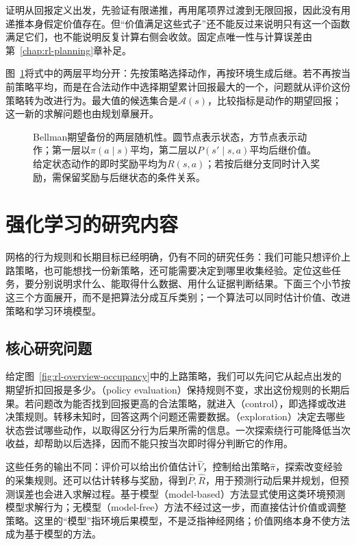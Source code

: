 证明从回报定义出发，先验证有限递推，再用尾项界过渡到无限回报，因此没有用递推本身假定价值存在。但“价值满足这些式子”还不能反过来说明只有这一个函数满足它们，也不能说明反复计算右侧会收敛。固定点唯一性与计算误差由第~\ref{chap:rl-planning}章补足。

图~\ref{fig:rl-overview-backup}将式中的两层平均分开：先按策略选择动作，再按环境生成后继。若不再按当前策略平均，而是在合法动作中选择期望累计回报最大的一个，问题就从评价这份策略转为改进行为。最大值的候选集合是$\mathcal A(s)$，比较指标是动作的期望回报；这一新的求解问题也由规划章展开。

\begin{figure}[htbp]
  \centering
  
  \caption{Bellman期望备份的两层随机性。圆节点表示状态，方节点表示动作；第一层以$\pi(a\mid s)$平均，第二层以$P(s'\mid s,a)$平均后继价值。给定状态动作的即时奖励平均为$R(s,a)$；若按后继分支同时计入奖励，需保留奖励与后继状态的条件关系。}
  \label{fig:rl-overview-backup}
\end{figure}

\section{强化学习的研究内容}
\label{sec:rl-overview-research}

网格的行为规则和长期目标已经明确，仍有不同的研究任务：我们可能只想评价上路策略，也可能想找一份新策略，还可能需要决定到哪里收集经验。定位这些任务，要分别说明求什么、能取得什么数据、用什么证据判断结果。下面三个小节按这三个方面展开，而不是把算法分成互斥类别；一个算法可以同时估计价值、改进策略和学习环境模型。

\subsection{核心研究问题}
\label{sec:rl-overview-questions}

给定图~\ref{fig:rl-overview-occupancy}中的上路策略，我们可以先问它从起点出发的期望折扣回报是多少。（policy evaluation）保持规则不变，求出这份规则的长期后果。若问题改为能否找到回报更高的合法策略，就进入（control），即选择或改进决策规则。转移未知时，回答这两个问题还需要数据。（exploration）决定去哪些状态尝试哪些动作，以取得区分行为后果所需的信息。一次探索绕行可能降低当次收益，却帮助以后选择，因而不能只按当次即时得分判断它的作用。

这些任务的输出不同：评价可以给出价值估计$\widehat V$，控制给出策略$\widehat\pi$，探索改变经验的采集规则。还可以估计转移与奖励，得到$\widehat P,\widehat R$，用于预测行动后果并规划，但预测误差也会进入求解过程。基于模型（model-based）方法显式使用这类环境预测模型求解行为；无模型（model-free）方法不经过这一步，而直接估计价值或调整策略。这里的“模型”指环境后果模型，不是泛指神经网络；价值网络本身不使方法成为基于模型的方法。

